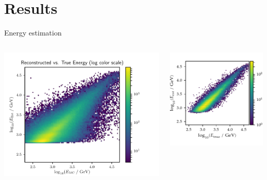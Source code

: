 \section{Results}
\begin{frame}[t]{Energy estimation}
\begin{columns}[onlytextwidth]
    \begin{column}{0.475\textwidth}
        \vspace{-25px}
        \includegraphics[width=1.15\textwidth,page=1]{fig/energy_performance.pdf}
    \end{column}
    \begin{column}{0.475\textwidth}
        \includegraphics[width=\textwidth]{fig/energy_migration.pdf}
    \end{column}
\end{columns}
\end{frame}

